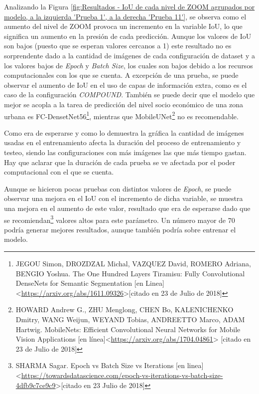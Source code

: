 Analizando la Figura \ref{fig:Resultados - IoU de cada nivel de ZOOM agrupados por modelo, a la izquierda 'Prueba 1', a la derecha 'Prueba 11'}, se observa como el aumento del nivel de ZOOM provoca un incremento en la variable IoU, lo que significa un aumento en la presión de cada predicción. Aunque los valores de IoU son bajos (puesto que se esperan valores cercanos a 1) este resultado no es sorprendente dado a la cantidad de imágenes de cada configuración de dataset y a los valores bajos de \textit{Epoch} y \textit{Batch Size}, los cuales son bajos debido a los recursos computacionales con los que se cuenta. A excepción de una prueba, se puede observar el aumento de IoU en el uso de capas de información extra, como es el caso de la configuración \textit{COMPOUND}. También se puede decir que el modelo que mejor se acopla a la tarea de predicción del nivel socio económico de una zona urbana es FC-DensetNet56\footnote[15]{JEGOU Simon, DROZDZAL Michal, VAZQUEZ David, ROMERO Adriana, BENGIO Yoshua. The One Hundred Layers Tiramisu: Fully Convolutional DenseNets for Semantic Segmentation [en Linea]<\url{https://arxiv.org/abs/1611.09326}>[citado en 23 de Julio de 2018]}, mientras que MobileUNet\footnote[16]{HOWARD Andrew G., ZHU Menglong, CHEN Bo, KALENICHENKO Dmitry, WANG Weijun, WEYAND Tobias, ANDREETTO Marco, ADAM Hartwig. MobileNets: Efficient Convolutional Neural Networks for Mobile Vision Applications [en línea]<\url{https://arxiv.org/abs/1704.04861}> [citado en 23 de Julio de 2018]} no es recomendable. 


Como era de esperarse y como lo demuestra la gráfica la cantidad de imágenes usadas en el entrenamiento afecta la duración del proceso de entrenamiento y testeo, siendo las configuraciones con más imágenes las que más tiempo gastan. Hay que aclarar que la duración de cada prueba se ve afectada por el poder computacional con el que se cuenta.



Aunque se hicieron pocas pruebas con distintos valores de \textit{Epoch}, se puede observar una mejora en el IoU con el incremento de dicha variable, se muestra una mejora en el aumento de este valor, resultado que era de esperarse dado que se recomiendan\footnote[18]{SHARMA Sagar. Epoch vs Batch Size vs Iterations [en linea]<\url{https://towardsdatascience.com/epoch-vs-iterations-vs-batch-size-4dfb9c7ce9c9}>[citado en 23 Julio de 2018]} valores altos para este parámetro. Un número mayor de 70 podría generar mejores resultados, aunque también podría sobre entrenar el modelo. 


